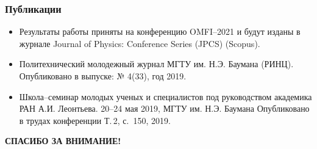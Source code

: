 \documentclass[compress,professionalfont]{beamer}
\begin{document}
\begin{frame}
\frametitle{Публикации}

\begin{itemize}
\item Результаты работы приняты на конференцию OMFI--2021 и будут изданы в журнале Journal of Physics: Conference Series (JPCS) (Scopus).
\item Политехнический молодежный журнал МГТУ им. Н.Э. Баумана (РИНЦ). Опубликовано в выпуске: № 4(33), год 2019.
\item Школа--семинар молодых ученых и специалистов под руководством академика РАН А.И. Леонтьева. 20–24 мая 2019, МГТУ им. Н.Э. Баумана
Опубликовано в трудах конференции Т.\,2, с.~150, 2019.
\end{itemize}
\end{frame}

\begin{frame}

\begin{center}
\Large\bf СПАСИБО ЗА ВНИМАНИЕ!
\end{center}

\end{frame}
\end{document}
